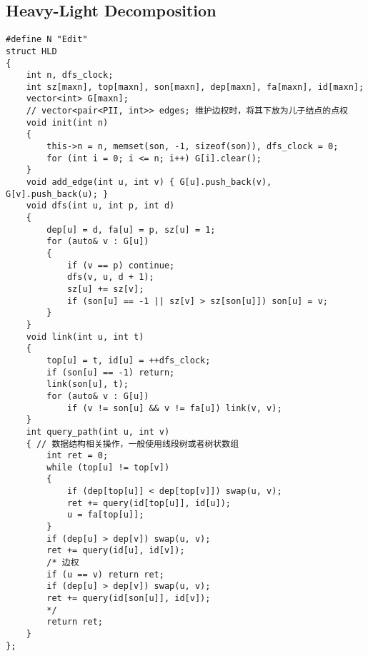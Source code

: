 \documentclass[twoside]{article}
\begin{document}
\subsection{Heavy-Light Decomposition}
\begin{lstlisting}
#define N "Edit"
struct HLD
{
    int n, dfs_clock;
    int sz[maxn], top[maxn], son[maxn], dep[maxn], fa[maxn], id[maxn];
    vector<int> G[maxn];
    // vector<pair<PII, int>> edges; 维护边权时，将其下放为儿子结点的点权
    void init(int n)
    {
        this->n = n, memset(son, -1, sizeof(son)), dfs_clock = 0;
        for (int i = 0; i <= n; i++) G[i].clear();
    }
    void add_edge(int u, int v) { G[u].push_back(v), G[v].push_back(u); }
    void dfs(int u, int p, int d)
    {
        dep[u] = d, fa[u] = p, sz[u] = 1;
        for (auto& v : G[u])
        {
            if (v == p) continue;
            dfs(v, u, d + 1);
            sz[u] += sz[v];
            if (son[u] == -1 || sz[v] > sz[son[u]]) son[u] = v;
        }
    }
    void link(int u, int t)
    {
        top[u] = t, id[u] = ++dfs_clock;
        if (son[u] == -1) return;
        link(son[u], t);
        for (auto& v : G[u])
            if (v != son[u] && v != fa[u]) link(v, v);
    }
    int query_path(int u, int v)
    { // 数据结构相关操作，一般使用线段树或者树状数组
        int ret = 0;
        while (top[u] != top[v])
        {
            if (dep[top[u]] < dep[top[v]]) swap(u, v);
            ret += query(id[top[u]], id[u]);
            u = fa[top[u]];
        }
        if (dep[u] > dep[v]) swap(u, v);
        ret += query(id[u], id[v]);
        /* 边权
        if (u == v) return ret;
        if (dep[u] > dep[v]) swap(u, v);
        ret += query(id[son[u]], id[v]);
        */
        return ret;
    }
};
\end{lstlisting}
\end{document}
